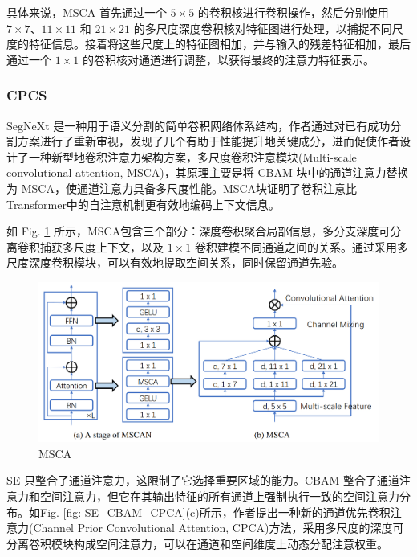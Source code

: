 \documentclass[a4paper]{ctexart}
\begin{document}
		具体来说，MSCA 首先通过一个 $5 \times 5$ 的卷积核进行卷积操作，然后分别使用 $7 \times 7$、$11 \times 11$ 和 $21 \times 21$ 的多尺度深度卷积核对特征图进行处理，以捕捉不同尺度的特征信息。接着将这些尺度上的特征图相加，并与输入的残差特征相加，最后通过一个 $1 \times 1$ 的卷积核对通道进行调整，以获得最终的注意力特征表示。
		
		\subsubsection*{CPCS}
		
		SegNeXt 是一种用于语义分割的简单卷积网络体系结构\cite{guo2022segnext}，作者通过对已有成功分割方案进行了重新审视，发现了几个有助于性能提升地关键成分，进而促使作者设计了一种新型地卷积注意力架构方案，多尺度卷积注意模块(Multi-scale convolutional attention, MSCA)，其原理主要是将 CBAM 块中的通道注意力替换为 MSCA，使通道注意力具备多尺度性能。MSCA块证明了卷积注意比Transformer中的自注意机制更有效地编码上下文信息。
		
		如 Fig. \ref{fig: MSCA} 所示，MSCA包含三个部分：深度卷积聚合局部信息，多分支深度可分离卷积捕获多尺度上下文，以及 $1 \times 1$ 卷积建模不同通道之间的关系。通过采用多尺度深度卷积模块，可以有效地提取空间关系，同时保留通道先验\cite{huang2023channel}。
		
		\begin{figure}[htbp]
			\centering
			\includegraphics[width=0.8\linewidth]{picture/LLIE/Experiment/Attention/MSCA}
			\caption{MSCA}
			\label{fig: MSCA}
		\end{figure}
			
	 	SE 只整合了通道注意力，这限制了它选择重要区域的能力。CBAM 整合了通道注意力和空间注意力，但它在其输出特征的所有通道上强制执行一致的空间注意力分布。如Fig. \ref{fig: SE_CBAM_CPCA}(c)所示，作者\cite{huang2023channel}提出一种新的通道优先卷积注意力(Channel Prior Convolutional Attention, CPCA)方法，采用多尺度的深度可分离卷积模块构成空间注意力，可以在通道和空间维度上动态分配注意权重。
	 	
\end{document}

